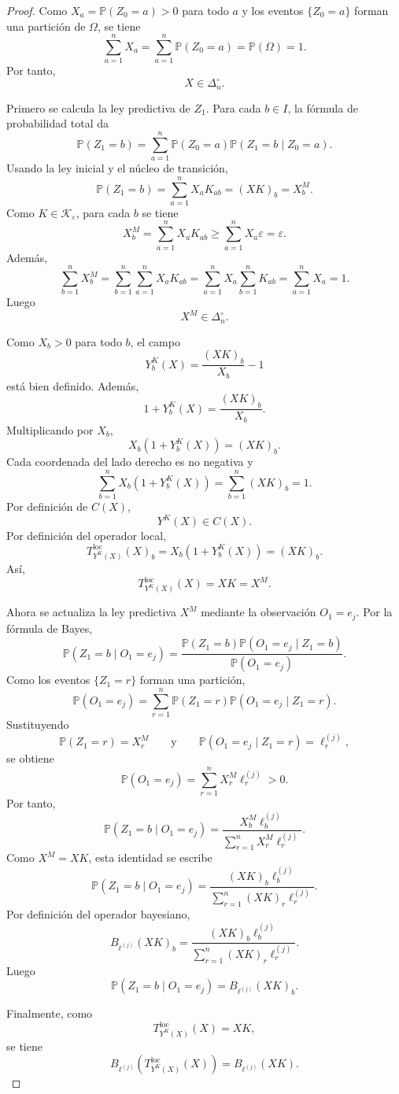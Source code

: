 ﻿\documentclass[12pt]{article}
\begin{document}
\begin{proof}
Como \(X_a=\mathbb P(Z_0=a)>0\) para todo \(a\) y los eventos \(\{Z_0=a\}\) forman una partición de \(\Omega\), se tiene
\[
\sum_{a=1}^nX_a
=
\sum_{a=1}^n\mathbb P(Z_0=a)
=
\mathbb P(\Omega)
=
1.
\]
Por tanto,
\[
X\in\Delta_n^\circ.
\]

Primero se calcula la ley predictiva de \(Z_1\). Para cada \(b\in I\), la fórmula de probabilidad total da
\[
\mathbb P(Z_1=b)
=
\sum_{a=1}^n
\mathbb P(Z_0=a)\mathbb P(Z_1=b\mid Z_0=a).
\]
Usando la ley inicial y el núcleo de transición,
\[
\mathbb P(Z_1=b)
=
\sum_{a=1}^nX_aK_{ab}
=
(XK)_b
=
X_b^M.
\]
Como \(K\in\mathcal K_\varepsilon\), para cada \(b\) se tiene
\[
X_b^M
=
\sum_{a=1}^nX_aK_{ab}
\ge
\sum_{a=1}^nX_a\varepsilon
=
\varepsilon.
\]
Además,
\[
\sum_{b=1}^nX_b^M
=
\sum_{b=1}^n\sum_{a=1}^nX_aK_{ab}
=
\sum_{a=1}^nX_a\sum_{b=1}^nK_{ab}
=
\sum_{a=1}^nX_a
=
1.
\]
Luego
\[
X^M\in\Delta_n^\circ.
\]

Como \(X_b>0\) para todo \(b\), el campo
\[
Y_b^K(X)
=
\frac{(XK)_b}{X_b}-1
\]
está bien definido. Además,
\[
1+Y_b^K(X)
=
\frac{(XK)_b}{X_b}.
\]
Multiplicando por \(X_b\),
\[
X_b(1+Y_b^K(X))
=
(XK)_b.
\]
Cada coordenada del lado derecho es no negativa y
\[
\sum_{b=1}^nX_b(1+Y_b^K(X))
=
\sum_{b=1}^n(XK)_b
=
1.
\]
Por definición de \(C(X)\),
\[
Y^K(X)\in C(X).
\]
Por definición del operador local,
\[
T^{\mathrm{loc}}_{Y^K(X)}(X)_b
=
X_b(1+Y_b^K(X))
=
(XK)_b.
\]
Así,
\[
T^{\mathrm{loc}}_{Y^K(X)}(X)=XK=X^M.
\]

Ahora se actualiza la ley predictiva \(X^M\) mediante la observación \(O_1=e_j\). Por la fórmula de Bayes,
\[
\mathbb P(Z_1=b\mid O_1=e_j)
=
\frac{\mathbb P(Z_1=b)\mathbb P(O_1=e_j\mid Z_1=b)}
{\mathbb P(O_1=e_j)}.
\]
Como los eventos \(\{Z_1=r\}\) forman una partición,
\[
\mathbb P(O_1=e_j)
=
\sum_{r=1}^n
\mathbb P(Z_1=r)\mathbb P(O_1=e_j\mid Z_1=r).
\]
Sustituyendo
\[
\mathbb P(Z_1=r)=X_r^M
\qquad
\text{y}
\qquad
\mathbb P(O_1=e_j\mid Z_1=r)=\ell_r^{(j)},
\]
se obtiene
\[
\mathbb P(O_1=e_j)
=
\sum_{r=1}^nX_r^M\ell_r^{(j)}
>
0.
\]
Por tanto,
\[
\mathbb P(Z_1=b\mid O_1=e_j)
=
\frac{X_b^M\ell_b^{(j)}}
{\sum_{r=1}^nX_r^M\ell_r^{(j)}}.
\]
Como \(X^M=XK\), esta identidad se escribe
\[
\mathbb P(Z_1=b\mid O_1=e_j)
=
\frac{(XK)_b\ell_b^{(j)}}
{\sum_{r=1}^n(XK)_r\ell_r^{(j)}}.
\]
Por definición del operador bayesiano,
\[
B_{\ell^{(j)}}(XK)_b
=
\frac{(XK)_b\ell_b^{(j)}}
{\sum_{r=1}^n(XK)_r\ell_r^{(j)}}.
\]
Luego
\[
\mathbb P(Z_1=b\mid O_1=e_j)
=
B_{\ell^{(j)}}(XK)_b.
\]

Finalmente, como
\[
T^{\mathrm{loc}}_{Y^K(X)}(X)=XK,
\]
se tiene
\[
B_{\ell^{(j)}}\!\left(T^{\mathrm{loc}}_{Y^K(X)}(X)\right)
=
B_{\ell^{(j)}}(XK).
\]
\end{proof}
\end{document}
